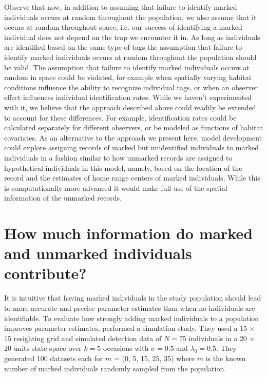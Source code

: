 Observe that now, in addition to assuming that failure to identify
marked individuals occurs at random throughout the population, we also
assume that it occurs at random throughout space, i.e. our success of
identifying a marked individual does not depend on the trap we
encounter it in. As long as individuals are identified based on the same type of tags
the assumption that failure to identify marked individuals occurs at
random throughout the population should be valid. The assumption that
failure to identify marked individuals occurs at random in space could
be violated, for example when spatially varying habitat conditions
influence the ability to recognize individual tags, or when an
observer effect influences individual identification rates. While we
haven't experimented with it, we believe that the approach
described above could readily be extended to account for these
differences. For example, identification rates could be calculated
separately for different observers, or be modeled as functions of
habitat covariates. As an alternative to the approach we present here,
model development could explore assigning records of marked but
unidentified individuals to marked individuals in a fashion similar to
how unmarked records are assigned to hypothetical individuals in this
model, namely, based on the location of the record and the estimates
of home range centers of marked individuals. While this is
computationally more advanced it would make full use of the spatial
information of the unmarked records.



\section{How much information do marked and unmarked individuals contribute?}
\label{partialID.sec.info}
It is intuitive that having marked individuals in the study population should lead to more accurate and precise parameter estimates than when no individuals are identifiable. To evaluate how strongly adding marked individuals to a population improves parameter estimates, \citet{chandler_royle:2012} performed a simulation study. They used a 15 $\times$ 15 resighting grid and
simulated detection data of $N = 75$ individuals in a 20 $\times$ 20 units state-space over $k = 5$ occasions with
$\sigma = 0.5$ and $\lambda_0 = 0.5$. They generated 100 datasets each for
$m$ = (0, 5, 15, 25, 35) where $m$ is the known number of marked individuals randomly sampled from the population.

